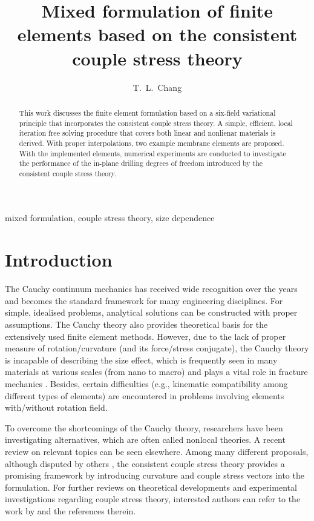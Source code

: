 \documentclass[3p,sort&compress,11pt,fleqn]{elsarticle}
\begin{document}
\begin{abstract}
This work discusses the finite element formulation based on a six-field variational principle that incorporates the consistent couple stress theory. A simple, efficient, local iteration free solving procedure that covers both linear and nonlienar materials is derived. With proper interpolations, two example membrane elements are proposed. With the implemented elements, numerical experiments are conducted to investigate the performance of the in-plane drilling degrees of freedom introduced by the consistent couple stress theory.
\end{abstract}
\begin{keyword}
mixed formulation\sep
couple stress theory\sep
size dependence
\end{keyword}
\begin{frontmatter}
\title{Mixed formulation of finite elements based on the consistent couple stress theory}
\author[]{T.~L.~Chang}
\address{Department of Civil and Natural Resources Engineering, University of Canterbury, Christchurch, New Zealand, 8041.}
\end{frontmatter}
\section{Introduction}
The Cauchy continuum mechanics has received wide recognition over the years and becomes the standard framework for many engineering disciplines. For simple, idealised problems, analytical solutions can be constructed \citep[see, e.g.,][]{Timoshenko2010} with proper assumptions. The Cauchy theory also provides theoretical basis for the extensively used finite element methods. However, due to the lack of proper measure of rotation/curvature (and its force/stress conjugate), the Cauchy theory is incapable of describing the size effect, which is frequently seen in many materials at various scales (from nano to macro) and plays a vital role in fracture mechanics \citep{Bazant1984}. Besides, certain difficulties (e.g., kinematic compatibility among different types of elements) are encountered in problems involving elements with/without rotation field.

To overcome the shortcomings of the Cauchy theory, researchers have been investigating alternatives, which are often called nonlocal theories. A recent review \citep{Shaat2020} on relevant topics can be seen elsewhere. Among many different proposals, although disputed by others \citep{Neff2016}, the consistent couple stress theory \citep{Hadjesfandiari2011} provides a promising framework by introducing curvature and couple stress vectors into the formulation. For further reviews on theoretical developments and experimental investigations regarding couple stress theory, interested authors can refer to the work by \citet{Pedgaonkar2021} and the references therein.
\end{document}
